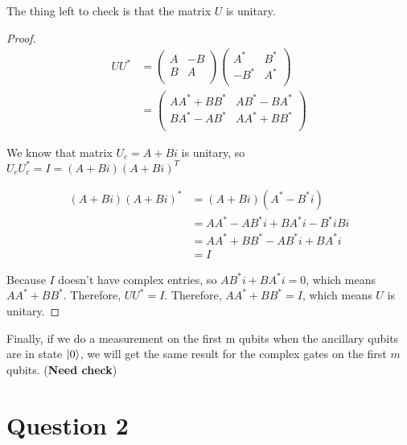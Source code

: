 \documentclass{article}
\theoremstyle{definition}
\DeclarePairedDelimiter\ket{\lvert}{\rangle}
\begin{document}
The thing left to check is that the matrix $U$ is unitary.

\begin{proof}
  \begin{align*}
    U U^{*} & =
    \begin{pmatrix}
      A & -B \\
      B & A  \\
    \end{pmatrix}
    \begin{pmatrix}
      A^*  & B^* \\
      -B^* & A^* \\
    \end{pmatrix}                           \\
            & = \begin{pmatrix}
                  A A^* + B B^* & AB^* - BA^*            \\
                  BA^* - AB^*            & A A^* + BB^* \\
                \end{pmatrix}
  \end{align*}

  We know that matrix $U_c=A+Bi$ is unitary,
  so $U_c U_c^*=I=(A+Bi)(A+Bi)^T$

  \[
    \begin{aligned}
      (A+Bi)(A+Bi)^* & = (A+Bi)(A^*-B^*i)               \\
                     & = AA^* - AB^*i + BA^*i - B^*i Bi \\
                     & = AA^* + BB^* - AB^*i + BA^*i                   \\
                     & = I
    \end{aligned}
  \]

  Because $I$ doesn't have complex entries, so \(AB^*i+BA^*i=0\), which means $AA^* + BB^*$.
  Therefore, $U U^*=I$.
  Therefore, $A A^* + B B^* = I$, which means $U$ is unitary.
\end{proof}

Finally, if we do a measurement on the first m qubits when the
ancillary qubits are in state $\ket{0}$, we will get the same result
for the complex gates on the first $m$ qubits. (\textbf{Need check})

\pagebreak

\section{Question 2}
\end{document}
